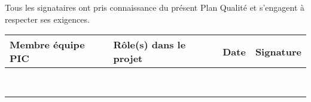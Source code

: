 Tous les signataires ont pris connaissance du présent Plan Qualité et s'engagent à respecter ses exigences. \\
	
	\vspace{1cm}

\begin{tabular}[h]{|p{}|p{}|p{}|p{}|}
	\hline
	
	\cellcolor{gray!40}Membre équipe PIC & \cellcolor{gray!40}Rôle(s) dans le projet & \cellcolor{gray!40}Date & \cellcolor{gray!40}Signature \\\hline
	\Pierre 	& \CP 			& & \\\hline
	\Francois 	& \CPA \newline \D 	& & \\\hline 
	\Kafui  	& \RQ 			& & \\\hline
	\Matthieu 	& \D \newline \RRS 	& & \\\hline
	\Florian 	& \D \newline \RS 	& & \\\hline
	\Melissa  	& \D \newline \RGC 	& & \\\hline
	\Julie 		& \D \newline \RD 	& & \\\hline
	\Juliana 	& \D 			& & \\\hline
\end{tabular}


